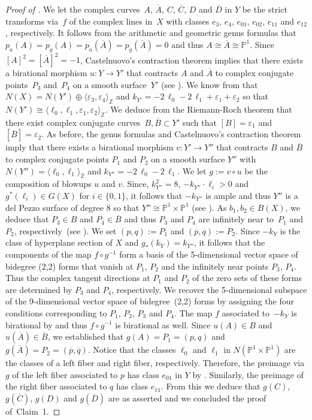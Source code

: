 \documentclass[11pt]{article}
\renewcommand{\P}{\mathbb{P}}
\newcommand{\Z}{\mathbb{Z}}
\newcommand{\oA}{{\overline{A}}}
\newcommand{\oB}{{\overline{B}}}
\newcommand{\oC}{{\overline{C}}}
\newcommand{\oD}{{\overline{D}}}
\newcommand{\op}{{\overline{p}}}
\newcommand{\oq}{{\overline{q}}}
\renewcommand{\c}{\colon}
\newcommand{\resp}{respectively}
\newcommand{\st}{such that }
\renewcommand{\k}{k}
\renewcommand{\l}{\ell}
\newcommand{\p}{\varepsilon}
\newcommand{\bas}[1]{\langle #1\rangle}
\begin{document}
\begin{proof}[Proof of ]
We let the complex curves~$A$, $\oA$, $C$, $\oC$, $D$ and $\oD$ in $Y$ be the strict transforms via~$f$
of the complex lines in~$X$ with classes
$e_3$, $e_4$, $e_{01}$, $e_{02}$, $e_{11}$ and $e_{12}$, \resp.
It follows from the arithmetic and geometric genus formulas \citep[Exercises~IV.1.8a and V.1.3]{1977}
that $p_a(A)=p_g(A)=p_a(\oA)=p_g(\oA)=0$ and thus $A\cong\oA\cong\P^1$.
Since $[A]^2=[\oA]^2=-1$,
Castelnuovo's contraction theorem implies
that there exists a birational morphism $u\c Y\to Y'$ that contracts
$A$ and $\oA$ to complex conjugate points~$P_3$ and~$P_4$ on a smooth surface~$Y'$
(see \citep[Theorem~V.5.7]{1977}).
We know from \citep[Propositions~V.3.2 and~V.3.3]{1977} that
$N(X)=N(Y')\oplus\bas{\p_3,\p_4}_\Z$ and $\k_{Y'}=-2\,\l_0-2\,\l_1+\p_1+\p_2$
so that $N(Y')\cong\bas{\l_0,\l_1,\p_1,\p_2}_\Z$.
We deduce from the Riemann-Roch theorem \citep[Theorem~V.1.6]{1977}
that there exist complex conjugate
curves~$B,\oB\subset Y'$ \st $[B]=\p_1$ and $[\oB]=\p_2$.
As before, the genus formulas
and Castelnuovo's contraction theorem imply that there exists a birational morphism
$v\c Y'\to Y''$ that contracts $B$ and $\oB$ to complex conjugate points $P_1$ and $P_2$
on a smooth surface $Y''$
with $N(Y'')=\bas{\l_0,\l_1}_\Z$ and $\k_{Y''}=-2\,\l_0-2\,\l_1$.
We let $g:=v\circ u$ be the composition of blowups $u$ and $v$.
Since, $\k_{Y''}^2=8$, $-\k_{Y''}\cdot \l_i>0$ and $g^*(\l_i)\in G(X)$ for $i\in\{0,1\}$,
it follows that $-\k_{Y''}$ is ample
and thus $Y''$ is a del Pezzo surface of degree 8
so that $Y''\cong\P^1\times\P^1$ (see \citep[Definition~8.1.12 and .1]{2012dol}).
As $b_1,b_2\in B(X)$, we deduce that $P_3\in B$ and $P_4\in\oB$
and thus $P_3$ and $P_4$ are infinitely near to~$P_1$ and $P_2$,
\resp~(see \citep[Definition at page~392]{1977}).
We set $(p,q):=P_1$ and $(\op,\oq):=P_2$.
Since $-\k_Y$ is the class of hyperplane section of $X$ and $g_*(\k_Y)=\k_{Y''}$,
it follows that the components of the map $f\circ g^{-1}$
form a basis of the 5-dimensional vector space of bidegree (2,2) forms that
vanish at $P_1$, $P_2$ and the infinitely near points $P_3$, $P_4$.
Thus the complex tangent directions at $P_1$ and $P_2$
of the zero sets of these forms are determined by $P_3$ and $P_4$, \resp.
We recover the 5-dimensional subspace of the 9-dimensional vector space of bidegree~(2,2) forms
by assigning the four conditions corresponding to $P_1$, $P_2$, $P_3$ and $P_4$.
The map $f$ associated to~$-\k_Y$ is birational by \citep[Theorem~8.3.2]{2012dol}
and thus $f\circ g^{-1}$ is birational as well.
Since $u(A)\in B$ and $u(\oA)\in\oB$, we established that $g(A)=P_1=(p,q)$ and $g(\oA)=P_2=(\op,\oq)$.
Notice that the classes $\l_0$ and $\l_1$ in $N(\P^1\times\P^1)$
are the classes of a left fiber and right fiber, \resp.
Therefore,
the preimage via $g$ of the left fiber associated to $p$ has class $e_{01}$ in $Y$ by \citep[Proposition~V.3.6]{1977}.
Similarly,
the preimage of the right fiber associated to $q$ has class $e_{11}$.
From this we deduce that
$g(C)$, $g(\oC)$, $g(D)$ and $g(\oD)$ are as asserted
and we concluded the proof of~Claim~1.


\end{proof}
\end{document}
